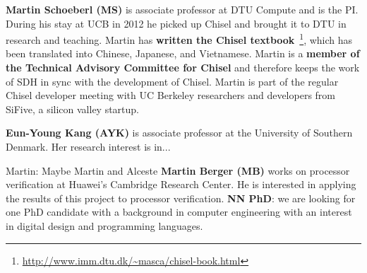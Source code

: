 \documentclass[fleqn,12pt]{article}
\newcommand{\martin}[1]{{\color{blue} Martin: #1}}
\begin{document}
{\bf Martin Schoeberl (MS)} is associate professor at DTU Compute and is the PI.
During his stay
at UCB in 2012 he picked up Chisel and brought it to DTU in research and teaching.
Martin has {\bf written the Chisel textbook}~\cite{chisel:book}\footnote{\url{http://www.imm.dtu.dk/~masca/chisel-book.html}}, which has been translated
into Chinese, Japanese, and Vietnamese. Martin is a {\bf member of the Technical Advisory Committee for
Chisel} and therefore keeps the work of SDH in sync with the development of Chisel.
Martin is part of the regular Chisel developer meeting with
UC Berkeley researchers and developers from SiFive, a silicon valley startup.


{\bf Eun-Young Kang (AYK)} is associate professor at the University of Southern Denmark.
Her research interest is in...


\martin{Maybe Martin and Alceste} {\bf Martin Berger (MB)} works on processor verification at Huawei's Cambridge Research Center.
He is interested in applying the results of this project to processor verification.
{\bf NN PhD}: we are looking for one PhD candidate with a background in computer engineering
with an interest in digital design and programming languages.
\end{document}
